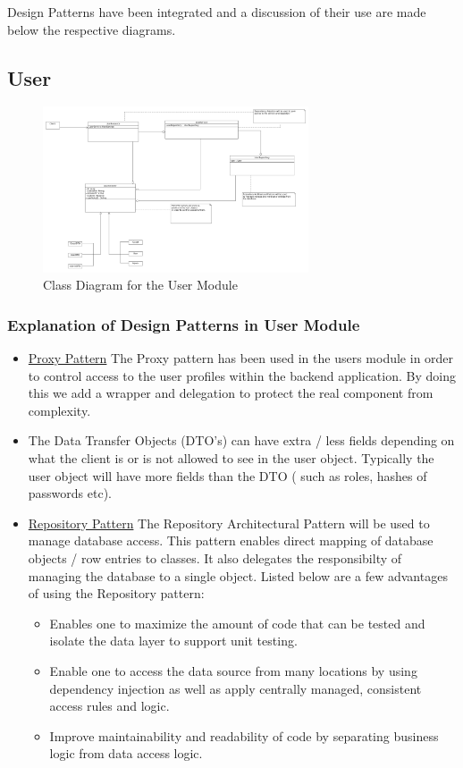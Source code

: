 \documentclass[runningheads,a4paper]{article}
\begin{document}
Design Patterns have been integrated and a discussion of their use are made below the respective diagrams.

\subsection{User} 

\begin{figure}[H]
   	\centering
   	\includegraphics[width=0.7\textwidth]{User_Class_Diagrams.png}
   	\caption{Class Diagram for the User Module}
\end{figure}
\subsubsection {Explanation of Design Patterns in User Module}
\begin{itemize}
\item \underline{Proxy Pattern} The Proxy pattern has been used in the users module in order to control access to the user profiles within the backend application. By doing this we add a wrapper and delegation to protect the real component from complexity. 

\item The Data Transfer Objects (DTO's)  can have extra / less fields depending on what the client is or is not allowed to see in the user object. Typically the user object will have more fields than the DTO ( such as roles, hashes of passwords etc). 

\item \underline{Repository Pattern} The Repository Architectural Pattern will be used to manage database access. This pattern enables direct mapping of database objects / row entries to classes. It also delegates the responsibilty of managing the database to a single object. Listed below are a few advantages of using the Repository pattern:
	\begin{itemize}
		\item Enables one to maximize the amount of code that can be tested and isolate the data layer to support unit testing. 
		\item Enable one to access the data source from many locations by using dependency injection as well as apply centrally managed, consistent access rules and logic.
		\item Improve maintainability and readability of code by separating business logic from data access logic.  
	\end{itemize} 
\end{itemize}
\end{document}
